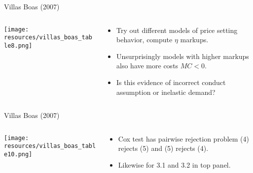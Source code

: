 \begin{frame}{Villas Boas (2007)}

\begin{columns}
\begin{column}{0.5\textwidth}
\texttt{[image: resources/villas\_boas\_table8.png]}
\end{column}
\begin{column}{0.5\textwidth}
\begin{itemize}
\item Try out different models of price setting behavior, compute $\eta$ markups.
\item Unsurprisingly models with higher markups also have more costs $MC < 0$.
\item Is this evidence of incorrect conduct assumption or inelastic demand?
\end{itemize}
\end{column}
\end{columns}
\end{frame}

\begin{frame}{Villas Boas (2007)}
\begin{columns}
\begin{column}{0.6\textwidth}
\begin{center}
\texttt{[image: resources/villas\_boas\_table10.png]}
\end{center}
\end{column}
\begin{column}{0.4\textwidth}
\begin{itemize}
\item Cox test has pairwise rejection problem (4) rejects (5) and (5) rejects (4).
\item Likewise for 3.1 and 3.2 in top panel.
\end{itemize}
\end{column}
\end{columns}


\end{frame}



